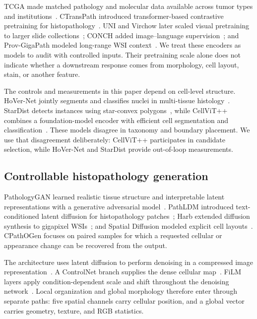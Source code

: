 TCGA made matched pathology and molecular data available across tumor types and institutions~\cite{tcga2013pancancer}. CTransPath introduced transformer-based contrastive pretraining for histopathology~\cite{wang2022ctranspath}. UNI and Virchow later scaled visual pretraining to larger slide collections~\cite{chen2024uni,vorontsov2024virchow}; CONCH added image--language supervision~\cite{lu2024conch}; and Prov-GigaPath modeled long-range WSI context~\cite{xu2024gigapath}. We treat these encoders as models to audit with controlled inputs. Their pretraining scale alone does not indicate whether a downstream response comes from morphology, cell layout, stain, or another feature.

The controls and measurements in this paper depend on cell-level structure. HoVer-Net jointly segments and classifies nuclei in multi-tissue histology~\cite{graham2019hovernet}. StarDist detects instances using star-convex polygons~\cite{schmidt2018stardist}, while CellViT++ combines a foundation-model encoder with efficient cell segmentation and classification~\cite{horst2026cellvitpp}. These models disagree in taxonomy and boundary placement. We use that disagreement deliberately: CellViT++ participates in candidate selection, while HoVer-Net and StarDist provide out-of-loop measurements.

\subsection{Controllable histopathology generation}

PathologyGAN learned realistic tissue structure and interpretable latent representations with a generative adversarial model~\cite{quiros2021pathologygan}. PathLDM introduced text-conditioned latent diffusion for histopathology patches~\cite{yellapragada2024pathldm}; Harb \etal{} extended diffusion synthesis to gigapixel WSIs~\cite{harb2024gigapixel}; and Spatial Diffusion modeled explicit cell layouts~\cite{li2024spatialdiffusion}. CPathOGen focuses on paired samples for which a requested cellular or appearance change can be recovered from the output.

The architecture uses latent diffusion to perform denoising in a compressed image representation~\cite{rombach2022latent}. A ControlNet branch supplies the dense cellular map~\cite{zhang2023controlnet}. FiLM layers apply condition-dependent scale and shift throughout the denoising network~\cite{perez2018film}. Local organization and global morphology therefore enter through separate paths: five spatial channels carry cellular position, and a global vector carries geometry, texture, and RGB statistics.

